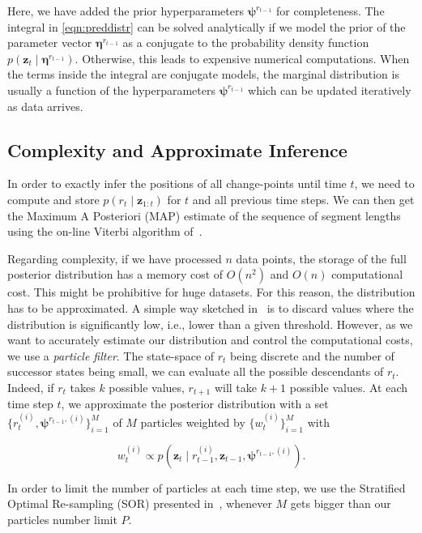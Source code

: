 Here, we have added the prior hyperparameters $\boldsymbol{\psi}^{r_{t-1}}$ for
completeness. The integral in \eqref{eqn:preddistr} can be solved analytically
if we model the prior of the parameter vector $\boldsymbol{\eta}^{r_{t-1}}$ as a
conjugate to the probability density function $p(\mathbf{z}_t\mid
\boldsymbol{\eta}^{r_{t-1}})$. Otherwise, this leads to expensive numerical
computations. When the terms inside the integral are conjugate models, the
marginal distribution is usually a function of the hyperparameters
$\boldsymbol{\psi}^{r_{t-1}}$ which can be updated iteratively as data arrives.

\subsection{Complexity and Approximate Inference}
In order to exactly infer the positions of all change-points until time $t$, we
need to compute and store $p(r_t\mid \mathbf{z}_{1:t})$ for $t$ and all previous
time steps. We can then get the Maximum A Posteriori (MAP) estimate of the
sequence of segment lengths using the on-line Viterbi
algorithm of~\cite{fearnhead07online}.

Regarding complexity, if we have processed $n$ data points, the storage of the
full posterior distribution has a memory cost of $O(n^2)$ and $O(n)$
computational cost. This might be prohibitive for huge datasets. For this
reason, the distribution has to be approximated. A simple way sketched
in~\cite{adams07bayesian} is to discard values where the distribution is
significantly low, i.e., lower than a given threshold. However, as we want to
accurately estimate our distribution and control the computational costs, we use
a \emph{particle filter}. The state-space of $r_t$ being discrete and the number
of successor states being small, we can evaluate all the possible descendants of
$r_t$. Indeed, if $r_t$ takes $k$ possible values, $r_{t+1}$ will take $k+1$
possible values. At each time step $t$, we approximate the posterior
distribution with a set $\{r_t^{(i)},\boldsymbol{\psi}^{r_{t-1},(i)}\}_{i=1}^M$ of
$M$ particles weighted by $\{w_t^{(i)}\}_{i=1}^M$ with

\begin{equation}
\label{eqn:weight}
w_t^{(i)} \propto p(\mathbf{z}_t\mid r_{t-1}^{(i)},\mathbf{z}_{t-1},
\boldsymbol{\psi}^{r_{t-1},(i)}).
\end{equation}

In order to limit the number of particles at each time step, we use the
Stratified Optimal Re-sampling (SOR) presented in~\cite{fearnhead07online},
whenever $M$ gets bigger than our particles number limit $P$.

